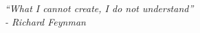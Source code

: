 \cleardoublepage
\thispagestyle{empty}
\begin{flushright}
\itshape “What I cannot create, I do not understand” \\
\vspace{2mm}
- Richard Feynman
\end{flushright}
\cleardoublepage